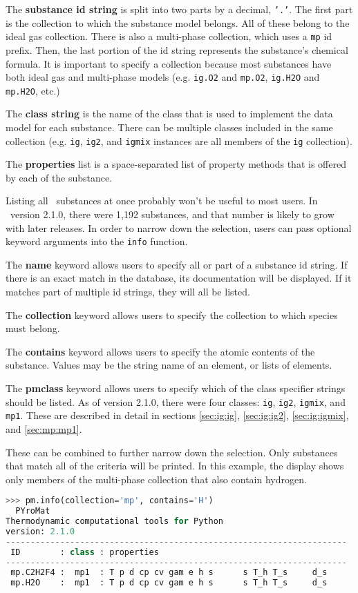 The {\bf substance id string} is split into two parts by a decimal, \texttt{'.'}.  The first part is the collection to which the substance model belongs.  All of these belong to the ideal gas collection.  There is also a multi-phase collection, which uses a \texttt{mp} id prefix.  Then, the last portion of the id string represents the substance's chemical formula.  It is important to specify a collection because most substances have both ideal gas and multi-phase models (e.g. \texttt{ig.O2} and \texttt{mp.O2}, \texttt{ig.H2O} and \texttt{mp.H2O}, etc.)

The {\bf class string} is the name of the class that is used to implement the data model for each substance.  There can be multiple classes included in the same collection (e.g. \texttt{ig}, \texttt{ig2}, and \texttt{igmix} instances are all members of the \texttt{ig} collection).

The {\bf properties} list is a space-separated list of property methods that is offered by each of the substance.  

Listing all \PM\ substances at once probably won't be useful to most users.  In \PM\ version 2.1.0, there were 1,192 substances, and that number is likely to grow with later releases.  In order to narrow down the selection, users can pass optional keyword arguments into the \texttt{info} function. 

The {\bf name} keyword allows users to specify all or part of a substance id string.  If there is an exact match in the database, its documentation will be displayed.  If it matches part of multiple id strings, they will all be listed.

The {\bf collection} keyword allows users to specify the collection to which species must belong.

The {\bf contains} keyword allows users to specify the atomic contents of the substance.  Values may be the string name of an element, or lists of elements.

The {\bf pmclass} keyword allows users to specify which of the class specifier strings should be listed.  As of version 2.1.0, there were four classes: \texttt{ig}, \texttt{ig2}, \texttt{igmix}, and \texttt{mp1}.  These are described in detail in sections \ref{sec:ig:ig}, \ref{sec:ig:ig2}, \ref{sec:ig:igmix}, and \ref{sec:mp:mp1}.

These can be combined to further narrow down the selection.  Only substances that match all of the criteria will be printed.  In this example, the display shows only members of the multi-phase collection that also contain hydrogen.
\begin{lstlisting}[language=Python,style=tinystyle]
>>> pm.info(collection='mp', contains='H')
  PYroMat
Thermodynamic computational tools for Python
version: 2.1.0
---------------------------------------------------------------------
 ID        : class : properties
---------------------------------------------------------------------
 mp.C2H2F4 :  mp1  : T p d cp cv gam e h s      s T_h T_s     d_s    
 mp.H2O    :  mp1  : T p d cp cv gam e h s      s T_h T_s     d_s    
\end{lstlisting}

